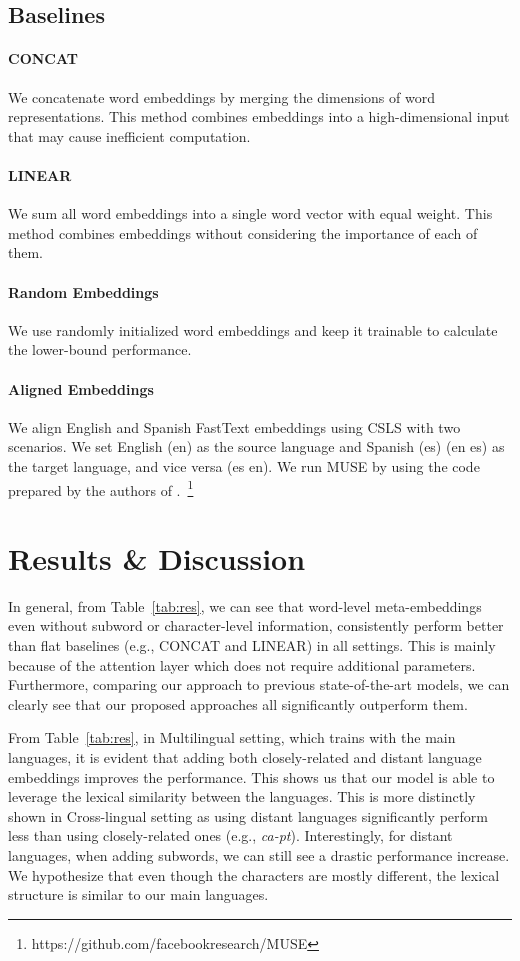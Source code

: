 \documentclass[11pt,a4paper]{article}
\begin{document}
\subsection{Baselines}
\paragraph{CONCAT} We concatenate word embeddings by merging the dimensions of word representations. This method combines embeddings into a high-dimensional input that may cause inefficient computation.

\paragraph{LINEAR} We sum all word embeddings into a single word vector with equal weight. This method combines embeddings without considering the importance of each of them.

\paragraph{Random Embeddings} We use randomly initialized word embeddings and keep it trainable to calculate the lower-bound performance.

\paragraph{Aligned Embeddings} We align English and Spanish FastText embeddings using CSLS with two scenarios. We set English (en) as the source language and Spanish (es) (en  es) as the target language, and vice versa (es  en). We run MUSE by using the code prepared by the authors of \citet{lample2018word}.~\footnote{https://github.com/facebookresearch/MUSE}

\section{Results \& Discussion}
In general, from Table~\ref{tab:res}, we can see that word-level meta-embeddings even without subword or character-level information, consistently perform better than flat baselines (e.g., CONCAT and LINEAR) in all settings. This is mainly because of the attention layer which does not require additional parameters. Furthermore, comparing our approach to previous state-of-the-art models, we can clearly see that our proposed approaches all significantly outperform them.


From Table~\ref{tab:res}, in Multilingual setting, which trains with the main languages, it is evident that adding both closely-related and distant language embeddings improves the performance. This shows us that our model is able to leverage the lexical similarity between the languages. This is more distinctly shown in Cross-lingual setting as using distant languages significantly perform less than using closely-related ones (e.g., \textit{ca-pt}). Interestingly, for distant languages, when adding subwords, we can still see a drastic performance increase. We hypothesize that even though the characters are mostly different, the lexical structure is similar to our main languages.
\end{document}
